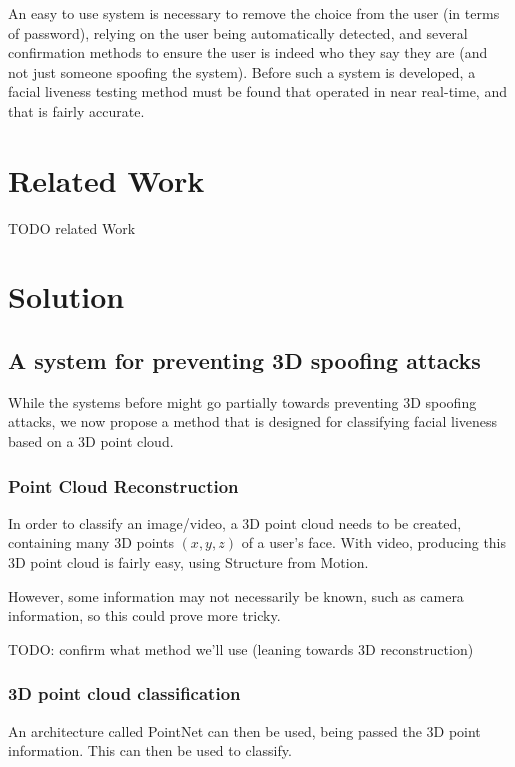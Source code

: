 \documentclass[10pt,a4paper]{article}
\begin{document}
    An easy to use system is necessary to remove the choice from the user (in terms of password), relying on the user being automatically
    detected, and several confirmation methods to ensure the user is indeed who they say they are (and not just someone spoofing the system).
    Before such a system is developed, a facial liveness testing method must be found that operated in near real-time, and that is fairly accurate.


\section{Related Work}
    TODO related Work

\section{Solution}

    \subsection{A system for preventing 3D spoofing attacks}
        While the systems before might go partially towards preventing 3D spoofing attacks, we now propose a method
        that is designed for classifying facial liveness based on a 3D point cloud.

        \subsubsection{Point Cloud Reconstruction}
            In order to classify an image/video, a 3D point cloud needs to be created, containing many 3D points $(x,y,z)$
            of a user's face. With video, producing this 3D point cloud is fairly easy, using Structure from Motion.

            However, some information may not necessarily be known, such as camera information, so this could prove more tricky.
            

            TODO: confirm what method we'll use (leaning towards 3D reconstruction)

        \subsubsection{3D point cloud classification}
            An architecture called PointNet can then be used, being passed the 3D point information. This can then be used to classify.
\end{document}
